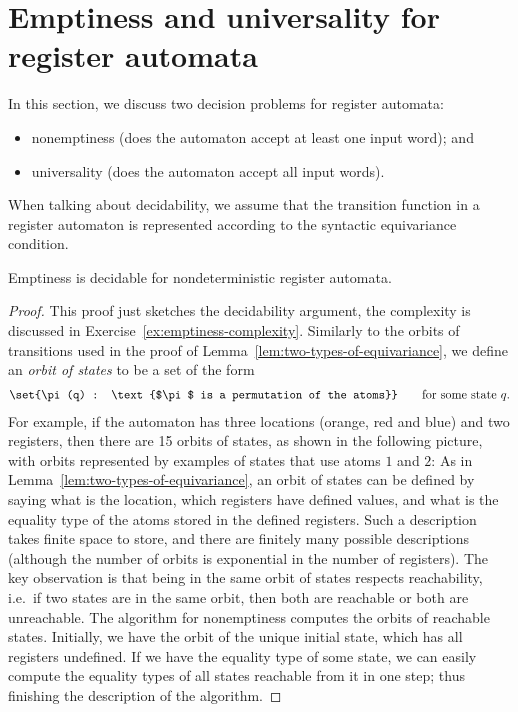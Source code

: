 \section{Emptiness and universality for register automata}
In this section, we discuss two decision problems for register automata:
\begin{itemize}
	\item nonemptiness (does the automaton accept at least one input word); and
	\item universality (does the automaton accept all input words).
\end{itemize}
 When talking about decidability, we assume that the transition function in a register automaton is represented according to the syntactic equivariance condition.
\begin{theorem}\label{thm:register-decidable-emptiness}Emptiness is decidable for nondeterministic register automata.
\end{theorem}
\begin{proof} This proof just sketches the decidability argument, the complexity is discussed in Exercise~\ref{ex:emptiness-complexity}.
Similarly to the orbits of transitions used in the proof of Lemma~\ref{lem:two-types-of-equivariance}, we define an \emph{orbit of states} to be a set of the form
\begin{align*}
	\set{\pi(q) : \text{$\pi$ is a permutation of the atoms}} \qquad \text{for some state $q$.}
\end{align*}
For example, if the automaton has three locations (orange, red and blue) and two registers, then there are 15 orbits of states, as shown in the following picture, with orbits represented by examples of states that use atoms $1$ and $2$:
 As in Lemma~\ref{lem:two-types-of-equivariance}, an orbit of states can be defined by saying what is the location, which registers have defined values, and what is the equality type of the atoms stored in the defined registers. Such a description takes finite space to store, and there are finitely many possible descriptions (although the number of orbits is exponential in the number of registers). The key observation is that being in the same orbit of states respects reachability, i.e.~if two states are in the same orbit, then both are reachable or both are unreachable. 	The algorithm for nonemptiness computes the orbits of reachable states. Initially, we have the orbit of the unique initial state, which has all registers undefined. If we have the equality type of some state, we can easily compute the equality types of all states reachable from it in one step; thus finishing the description of the algorithm.
\end{proof}


